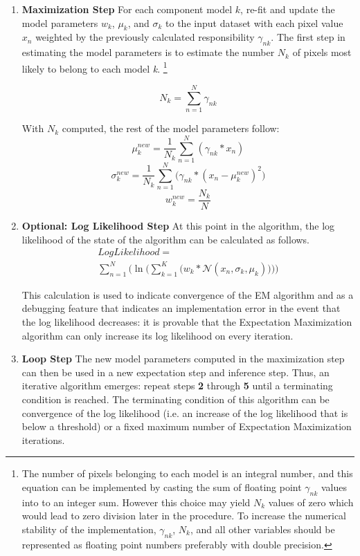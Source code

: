 \documentclass[conference]{IEEEtran}
\begin{document}
\begin{enumerate}
\item \textbf{Maximization Step} For each component model $k$, re-fit and update the model parameters $w_k$, $\mu_k$, and $\sigma_k$ to the input dataset with each pixel value $x_n$ weighted by the previously calculated responsibility $\gamma_{nk}$. The first step in estimating the model parameters is to estimate the number $N_k$ of pixels most likely to belong to each model \emph{k}. \footnote{The number of pixels belonging to each model is an integral number, and this equation can be implemented by casting the sum of floating point $\gamma_{nk}$ values into to an integer sum. However this choice may yield $N_k$ values of zero which would lead to zero division later in the procedure. To increase the numerical stability of the implementation, $\gamma_{nk}$, $N_k$, and all other variables should be represented as floating point numbers preferably with double precision.}

\begin{equation}
    N_k = \sum_{n=1}^{N}\gamma_{nk}
\end{equation}

With $N_k$ computed, the rest of the model parameters follow:
\begin{equation}
    \mu_{k}^{new} = \frac{1}{N_k}\sum_{n=1}^{N}(\gamma_{nk} * x_{n})
\end{equation}
\begin{equation}
    \sigma_{k}^{new} = \frac{1}{N_k}\sum_{n=1}^{N}\Big(\gamma_{nk} * (x_{n} - \mu_{k}^{new})^2\Big)
\end{equation}
\begin{equation}
    w_{k}^{new} = \frac{N_k}{N}
\end{equation}

\item \textbf{Optional: Log Likelihood Step} At this point in the algorithm, the log likelihood of the state of the algorithm can be calculated as follows. 
\begin{multline}
    Log Likelihood = \\
    \sum_{n=1}^{N}\Bigg(\ln{\Big(\sum_{k=1}^{K}\big(w_k * \mathcal{N}(x_n, \sigma_k, \mu_k)\big)\Big)}\Bigg)
\end{multline}

This calculation is used to indicate convergence of the EM algorithm and as a debugging feature that indicates an implementation error in the event that the log likelihood decreases: it is provable \cite{RussellNorvig} that the Expectation Maximization algorithm can only increase its log likelihood on every iteration. 

\item \textbf{Loop Step} The new model parameters computed in the maximization step can then be used in a new expectation step and inference step. Thus, an iterative algorithm emerges: repeat steps \textbf{2} through \textbf{5} until a terminating condition is reached. The terminating condition of this algorithm can be convergence of the log likelihood (i.e. an increase of the log likelihood that is below a threshold) or a fixed maximum number of Expectation Maximization iterations.
\end{enumerate}
\end{document}

